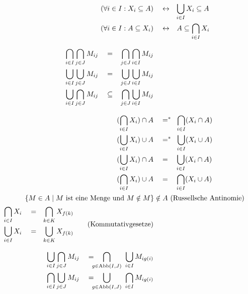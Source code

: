 \begin{align*}
    (\forall i\in I : X_i \subseteq A) & \quad\leftrightarrow\quad\hspace{-.24em} \smashoperator[l]{\bigcup_{i\in I}} X_i \subseteq A \\
    (\forall i\in I : A\subseteq X_i) & \quad\leftrightarrow\quad\hspace{-.24em} A \subseteq \bigcap_{i\in I} X_i \\[0.8em]
    \begin{split}
    \bigcap_{i\in I} \bigcap_{j\in J} M_{ij} & \quad =\quad \smashoperator[l]{\bigcap_{j\in J}}\bigcap_{i\in I} M_{ij} \\
    \bigcup_{i\in I} \bigcup_{j\in J} M_{ij} & \quad =\quad \smashoperator[l]{\bigcup_{j\in J}}\bigcup_{i\in I} M_{ij} \\
    \bigcup_{i\in I}\bigcap_{j\in J} M_{ij} & \quad\subseteq\quad \smashoperator[l]{\bigcap_{j\in J}}\bigcup_{i\in I} M_{ij}
    \end{split} && \\[0.8em]
    (\bigcap_{i\in I} X_i) \cap A & \quad =^* \quad\hspace{-.4em} \smashoperator[l]{\bigcap_{i \in I}} (X_i \cap A) \\
    (\bigcup_{i\in I} X_i) \cup A & \quad =^* \quad\hspace{-.4em} \smashoperator[l]{\bigcup_{i\in I}} (X_i \cup A) \\
    (\bigcup_{i\in I} X_i) \cap A & \quad =\quad \smashoperator[l]{\bigcup_{i\in I}} (X_i \cap A) \\
    (\bigcap_{i\in I} X_i) \cup A & \quad =\quad \smashoperator[l]{\bigcap_{i\in I}} (X_i \cup A) \\ %
    \intertext{\qquad\quad$\{ M\in A\mid M\ \text{ist eine Menge und}\ M\notin M \} \notin A$ \hfill (Russellsche Antinomie)}
    \begin{split}
        \bigcap_{i\in I} X_i & \quad =\quad \smashoperator[l]{\bigcap_{k\in K}} X_{f(k)} \\
        \bigcup_{i\in I} X_i & \quad =\quad \smashoperator[l]{\bigcup_{k\in K}} X_{f(k)}
    \end{split} \tag{Kommutativgesetze} \\[0.8em]
    \begin{split}
        \bigcup_{i \in I} \bigcap_{j \in J} M_{ij} & \quad =\quad \smashoperator[l]{\bigcap_{g \in \Abb(I,J)}}\ \bigcup_{i \in I} M_{ig(i)} \\ %
        \bigcap_{i \in I} \bigcup_{j \in J} M_{ij} & \quad =\quad \smashoperator[l]{\bigcup_{g \in \Abb(I,J)}}\ \bigcap_{i \in I} M_{ig(i)} %

\end{split}
\end{align*}
